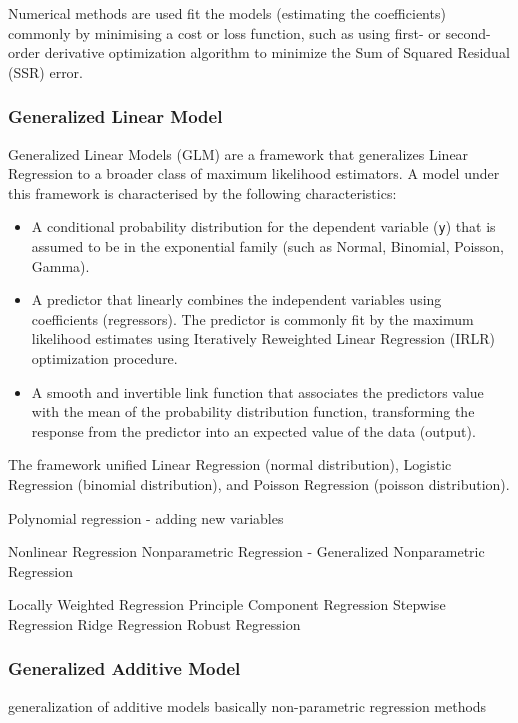 \begin{bibunit}
Numerical methods are used fit the models (estimating the coefficients) commonly by minimising a cost or loss function, such as using first- or second-order derivative optimization algorithm to minimize the Sum of Squared Residual (SSR) error.

\subsubsection{Generalized Linear Model}
Generalized Linear Models (GLM) are a framework that generalizes Linear Regression to a broader class of maximum likelihood estimators. A model under this framework is characterised by the following characteristics:

\begin{itemize}
	\item A conditional probability distribution for the dependent variable (\texttt{y}) that is assumed to be in the exponential family (such as Normal, Binomial, Poisson, Gamma).
	\item A predictor that linearly combines the independent variables using coefficients (regressors). The predictor is commonly fit by the maximum likelihood estimates using Iteratively Reweighted Linear Regression (IRLR) optimization procedure.
	\item A smooth and invertible link function that associates the predictors value with the mean of the probability distribution function, transforming the response from the predictor into an expected value of the data (output).
\end{itemize}


The framework unified Linear Regression (normal distribution), Logistic Regression (binomial distribution), and Poisson Regression (poisson distribution). 

Polynomial regression - adding new variables


Nonlinear Regression
Nonparametric Regression - Generalized Nonparametric Regression

Locally Weighted Regression
Principle Component Regression
Stepwise Regression
Ridge Regression
Robust Regression

\subsubsection{Generalized Additive Model}
generalization of additive models
basically non-parametric regression methods


\end{bibunit}
